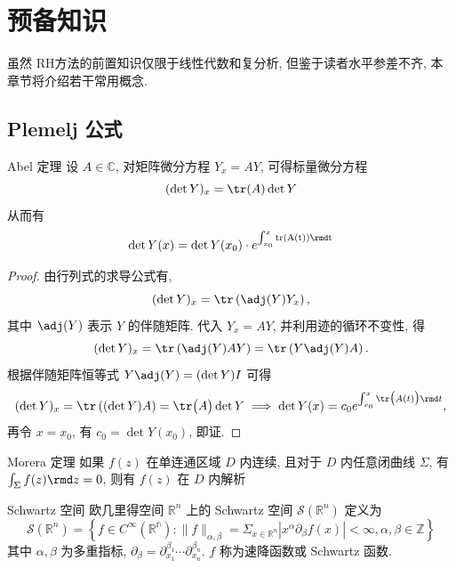 \chapter{预备知识}
虽然 RH方法的前置知识仅限于线性代数和复分析, 但鉴于读者水平参差不齐, 本章节将介绍若干常用概念.
\section{Plemelj 公式}
\begin{theorem}{Abel 定理} \label{ch1-thm-Abel}
    设 $ A \in \mathbb{C} $, 对矩阵微分方程 $ Y_{x} = AY $, 可得标量微分方程
    \begin{equation}
        (\det Y)_{x} = \tr(A) \det Y
    \end{equation}
    从而有
    \begin{equation}
        \det Y(x) = \det Y(x_{0}) \cdot e^{\int_{x_{0}}^{x} \rm{tr}(A(t)) \rmd t}
    \end{equation}
\end{theorem}
\begin{proof}
    由行列式的求导公式有,
    \begin{equation}
        (\det Y)_x = \tr\left(\adj(Y)Y_x\right),
    \end{equation}
    其中 $\adj(Y)$ 表示 $Y$ 的伴随矩阵. 代入 $Y_{x}=AY$, 并利用迹的循环不变性, 得
    \begin{equation}
        (\det Y)_{x} = \tr\left( \adj(Y) A Y \right) = \tr\left(Y\adj(Y)A\right).
    \end{equation}
    根据伴随矩阵恒等式 $Y \adj(Y)=(\det Y) I$ 可得
    \begin{equation}
        (\det Y)_{x} = \tr\left((\det Y) A\right) = \tr\bigl(A\bigr)\det Y
        \implies
        \det Y(x) = c_{0} e^{\int_{x_0}^{x}\tr\bigl(A(t)\bigr) \rmd t},
    \end{equation}
    再令 $x=x_{0}$, 有 $c_{0} = \det Y(x_0)$, 即证.
\end{proof}
\begin{theorem}{Morera 定理}\label{ch1-thm-Morera}
    如果 $ f(z) $ 在单连通区域 $ D $ 内连续, 且对于 $ D $ 内任意闭曲线 $ \Sigma $, 有 $ \int_{\Sigma} f(z) \rmd z = 0 $, 则有 $ f(z) $ 在 $ D $ 内解析
\end{theorem}
\begin{definition}{Schwartz 空间}
    欧几里得空间 $ \mathbb{R}^{n} $ 上的 Schwartz 空间 $ \mathcal{S}(\mathbb{R}^{n}) $ 定义为
    \begin{equation}
        \mathcal{S}(\mathbb{R}^{n}) = \left\{ f \in C^{\infty}(\mathbb{R^{n}}) : \| f \|_{\alpha, \beta} = \Sigma_{x \in \mathbb{R}^{n}} | x^{\alpha} \partial_{\beta}f(x) | < \infty, \alpha, \beta \in \mathbb{Z} \right\}
    \end{equation}
    其中 $ \alpha, \beta $ 为多重指标, $ \partial_{\beta} = \partial_{x_{1}}^{\beta_{1}} \cdots \partial_{x_{n}}^{\beta_{n}} $. $ f $ 称为速降函数或 Schwartz 函数.
\end{definition}

